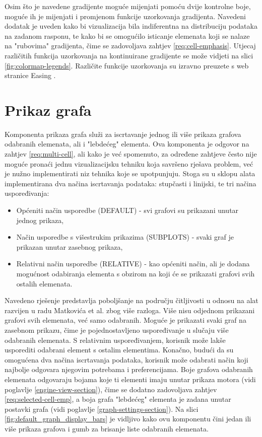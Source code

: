 \documentclass[times, utf8, diplomski]{fer}
\begin{document}
Osim što je navedene gradijente moguće mijenjati pomoću dvije kontrolne boje, moguće ih je mijenjati i promjenom funkcije uzorkovanja gradijenta. Navedeni dodatak je uveden kako bi vizualizacija bila indiferentna na distribuciju podataka na zadanom rasponu, te kako bi se omogućilo isticanje elemenata koji se nalaze na "rubovima" gradijenta, čime se zadovoljava zahtjev \ref{req:cell-emphasis}. Utjecaj različitih funkcija uzorkovanja na kontinuirane gradijente se može vidjeti na slici \ref{fig:colormap-legends}. Različite funkcije uzorkovanja su izravno preuzete s web stranice Easing \citep{easing}.

\section{Prikaz grafa} \label{graph-view-section}

Komponenta prikaza grafa služi za iscrtavanje jednog ili više prikaza grafova odabranih elemenata, ali i "lebdećeg" elementa. Ova komponenta je odgovor na zahtjev \ref{req:multi-cell}, ali kako je već spomenuto, za određene zahtjeve često nije moguće pronaći jednu vizualizacijsku tehniku koja savršeno rješava problem, već je nužno implementirati niz tehnika koje se upotpunjuju. Stoga su u sklopu alata implementirana dva načina iscrtavanja podataka: stupčasti i linijski, te tri načina uspoređivanja:
\begin{itemize}
\item Općeniti način usporedbe (DEFAULT) - svi grafovi su prikazani unutar jednog prikaza,
\item Način usporedbe s višestrukim prikazima (SUBPLOTS) - svaki graf je prikazan unutar zasebnog prikaza,
\item Relativni način usporedbe (RELATIVE) - kao općeniti način, ali je dodana mogućnost odabiranja elementa s obzirom na koji će se prikazati grafovi svih ostalih elemenata.\\
\end{itemize}

Navedeno rješenje predstavlja poboljšanje na području čitljivosti u odnosu na alat razvijen u radu Matkovića et al. \citep{matkovic2021getting} zbog više razloga. Više nisu odjednom prikazani grafovi svih elemenata, već samo odabranih. Moguće je prikazati svaki graf na zasebnom prikazu, čime je pojednostavljeno uspoređivanje u slučaju više odabranih elemenata. S relativnim uspoređivanjem, korisnik može lakše usporediti odabrani element s ostalim elementima. Konačno, budući da su omogućena dva načina iscrtavanja podataka, korisnik može odabrati način koji najbolje odgovara njegovim potrebama i preferencijama. Boje grafova odabranih elemenata odgovaraju bojama koje ti elementi imaju unutar prikaza motora (vidi poglavlje \ref{engine-view-section}), čime se dodatno zadovoljava zahtjev \ref{req:selected-cell-emp}, a boja grafa "lebdećeg" elementa je zadana unutar postavki grafa (vidi poglavlje \ref{graph-settings-section}). Na slici \ref{fig:default_graph_display_bars} je vidljivo kako ovu komponentu čini jedan ili više prikaza grafova i gumb za brisanje liste odabranih elemenata.
\end{document}
